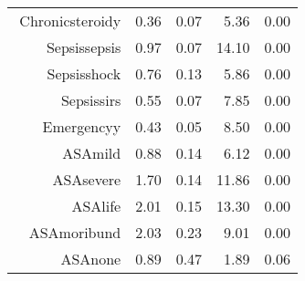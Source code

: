 \begin{tabular}{rrrrr}
$$  Chronic\-steroid\-y & 0.36 & 0.07 & 5.36 & 0.00 \\ 
  Sepsis\-sepsis & 0.97 & 0.07 & 14.10 & 0.00 \\ 
  Sepsis\-shock & 0.76 & 0.13 & 5.86 & 0.00 \\ 
  Sepsis\-sirs & 0.55 & 0.07 & 7.85 & 0.00 \\ 
  Emergency\-y & 0.43 & 0.05 & 8.50 & 0.00 \\ 
  ASA\-mild & 0.88 & 0.14 & 6.12 & 0.00 \\ 
  ASA\-severe & 1.70 & 0.14 & 11.86 & 0.00 \\ 
  ASA\-life & 2.01 & 0.15 & 13.30 & 0.00 \\ 
  ASA\-moribund & 2.03 & 0.23 & 9.01 & 0.00 \\ 
  ASA\-none & 0.89 & 0.47 & 1.89 & 0.06 \\ 
   \hline
\end{tabular}

